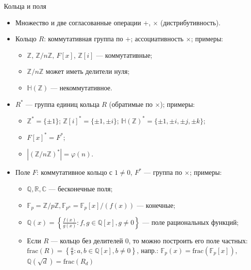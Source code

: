 \documentclass[serif, aspectratio=169]{beamer}
\begin{document}
\begin{frame}{Кольца и поля}
    \begin{itemize}
        \item Множество и две согласованные операции $+$, $\times$ (дистрибутивность).
        \item Кольцо $R$: коммутативная группа по $+$; ассоциативность $\times$; примеры:
        \begin{itemize}
            \item $\mathbb{Z}$, $\mathbb{Z}/n\mathbb{Z}$, $F[x]$, $\mathbb{Z}[i]$ --- коммутативные;
            \item $\mathbb{Z}/n\mathbb{Z}$ может иметь делители нуля;
            \item $\mathbb{H}(\mathbb{Z})$ --- некоммутативное.
        \end{itemize}
        \item $R^*$ --- группа единиц кольца $R$ (обратимые по $\times$); примеры:
        \begin{itemize}
            \item $\mathbb{Z}^*=\{\pm1\}$; $\mathbb{Z}[i]^*=\{\pm1,\pm i\}$; $\mathbb{H}(\mathbb{Z})^* = \{\pm1,\pm i,\pm j,\pm k\}$;
            \item $F[x]^*=F^*$;
            \item $|(\mathbb{Z}/n\mathbb{Z})^*|=\varphi(n)$.
        \end{itemize}
        \item Поле $F$: коммутативное кольцо с $1\ne0$, $F^*$ --- группа по $\times$; примеры:
        \begin{itemize}
            \item $\mathbb{Q},\mathbb{R},\mathbb{C}$ --- бесконечные поля;
            \item $\mathbb{F}_p=\mathbb{Z}/p\mathbb{Z}, \mathbb{F}_{p^n}=\mathbb{F}_p[x]/(f(x))$ --- конечные;
            \item $\mathbb{Q}(x) = \left\{\frac{f(x)}{g(x)}: f,g\in\mathbb{Q}[x], g\neq 0\right\}$ --- поле рациональных функций;
            \item Если $R$ --- кольцо без делителей 0, то можно построить его поле частных: $\mathrm{frac}(R)=\left\{\frac{a}{b}: a,b\in\mathbb{Q}[x], b\neq 0\right\}$, напр.: $\mathbb{F}_p(x)=\mathrm{frac}(\mathbb{F}_p[x])$, $\mathbb{Q}(\sqrt{d})=\mathrm{frac}(R_d)$
        \end{itemize}
    \end{itemize}
\end{frame}
\end{document}
